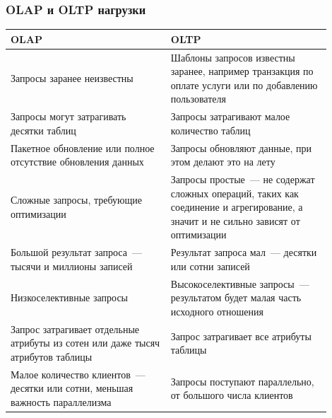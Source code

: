 \documentclass{beamer}
\begin{document}
\begin{frame}
\frametitle{OLAP и OLTP нагрузки}

{\scriptsize

\begin{table}
\begin{center}
\begin{tabular}{|p{0.45\linewidth}|p{0.45\linewidth}|}
\hline
OLAP & OLTP \\
\hline
Запросы заранее неизвестны & Шаблоны запросов известны заранее, например транзакция по оплате услуги или по добавлению пользователя \\
\hline
Запросы могут затрагивать десятки таблиц & Запросы затрагивают малое количество таблиц \\
\hline
Пакетное обновление или полное отсутствие обновления данных & Запросы обновляют данные, при этом делают это на лету \\
\hline
Сложные запросы, требующие оптимизации & Запросы простые~--- не содержат сложных операций, таких как соединение и агрегирование, а значит и не сильно зависят от оптимизации \\
\hline
Большой результат запроса~--- тысячи и миллионы записей & Результат запроса мал~---  десятки или сотни записей \\
\hline
Низкоселективные запросы & 	Высокоселективные запросы~--- результатом будет малая часть исходного отношения \\
\hline
Запрос затрагивает отдельные атрибуты из сотен или даже тысяч атрибутов таблицы & Запрос затрагивает все атрибуты таблицы \\
\hline
Малое количество клиентов~--- десятки или сотни, меньшая важность параллелизма & Запросы поступают параллельно, от большого числа клиентов \\
\hline
\end{tabular}
\end{center}
\end{table}
}

\end{frame}
\end{document}
